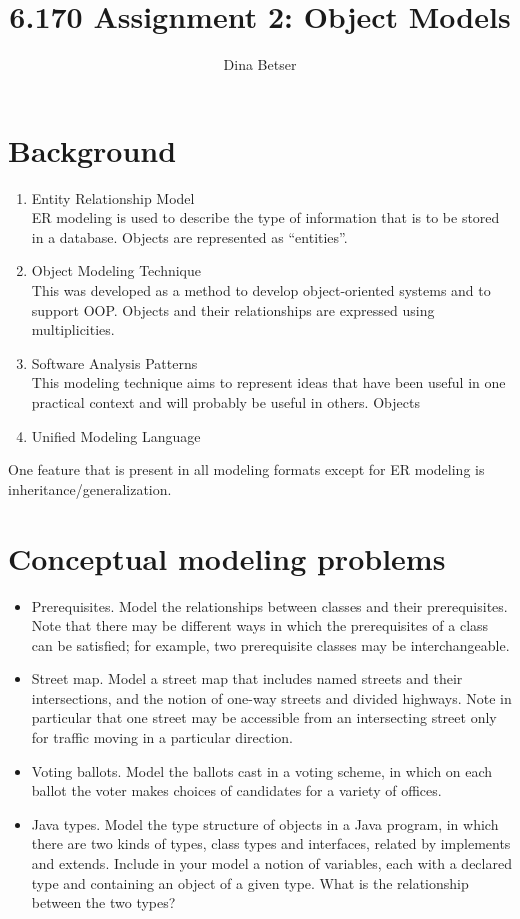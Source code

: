 \documentclass[11pt,letterpaper]{article}
\title{6.170 Assignment 2: Object Models}
\author{Dina Betser}
\begin{document}
\maketitle

\section{Background}
\begin{enumerate}
\item Entity Relationship Model\\
ER modeling is used to describe the type of information that is to be stored in a database. Objects are represented as ``entities''.
\item Object Modeling Technique\\
This was developed as a method to develop object-oriented systems and to support OOP. Objects and their relationships are expressed using multiplicities.
\item Software Analysis Patterns\\
This modeling technique aims to represent ideas that have been useful in one practical context and will probably be useful in others. Objects
\item Unified Modeling Language\\

\end{enumerate}

One feature that is present in all modeling formats except for ER modeling is inheritance/generalization.

\section{Conceptual modeling problems}
\begin{itemize}
\item Prerequisites. Model the relationships between classes and their prerequisites. Note that there may be different ways in which the prerequisites of a class can be satisfied; for example, two prerequisite classes may be interchangeable.\\

\item Street map. Model a street map that includes named streets and their intersections, and the notion of one-way streets and divided highways. Note in particular that one street may be accessible from an intersecting street only for traffic moving in a particular direction.
\item Voting ballots. Model the ballots cast in a voting scheme, in which on each ballot the voter makes choices of candidates for a variety of offices.
\item Java types. Model the type structure of objects in a Java program, in which there are two kinds of types, class types and interfaces, related by implements and extends. Include in your model a notion of variables, each with a declared type and containing an object of a given type. What is the relationship between the two types?\\

\end{itemize}
\end{document}
